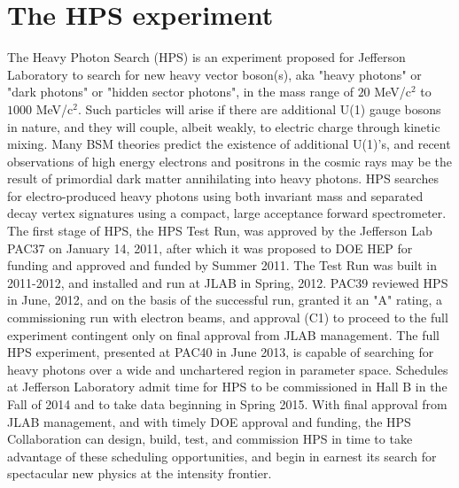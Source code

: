 \documentclass[11pt]{report}
\begin{document}
\newpage

\tableofcontents\newpage


\section{The HPS experiment}
The Heavy Photon Search (HPS) is an experiment proposed for Jefferson Laboratory to search for new heavy vector boson(s), aka "heavy photons" or "dark photons" or "hidden sector photons", in the mass range of $20$ MeV/c$^2$ to $1000$ MeV/c$^2$. Such particles will arise if there are additional U(1) gauge bosons in nature, and they will couple, albeit weakly, to electric charge through kinetic mixing. Many BSM theories predict the existence of additional U(1)'s, and recent observations of high energy electrons and positrons in the cosmic rays may be the result of primordial dark matter annihilating into heavy photons. HPS searches for  electro-produced heavy photons using both invariant mass and separated decay vertex signatures using a compact, large acceptance forward spectrometer. 
The first stage of HPS, the HPS Test Run, was approved by the Jefferson Lab PAC37 on January 14, 2011, after which it was proposed to DOE HEP for funding and approved and funded by Summer 2011. The Test Run was built in 2011-2012, and installed and run at JLAB in Spring, 2012.  PAC39 reviewed  HPS in June, 2012, and on the basis of the successful run, granted it an "A" rating, a commissioning run with electron beams, and approval (C1) to proceed to the full experiment contingent only on final approval from JLAB management. The full HPS experiment, presented at PAC40 in June 2013,  is capable of searching for heavy photons over a wide and unchartered region in parameter space. Schedules at Jefferson Laboratory admit time for HPS to be commissioned in Hall B in the Fall of 2014 and to take data beginning in Spring 2015. With final approval from JLAB management, and with timely DOE approval and funding, the HPS Collaboration can design, build, test, and commission HPS in time to take advantage of these scheduling opportunities, and begin in earnest its search for spectacular new physics at the intensity frontier.   
\end{document}
